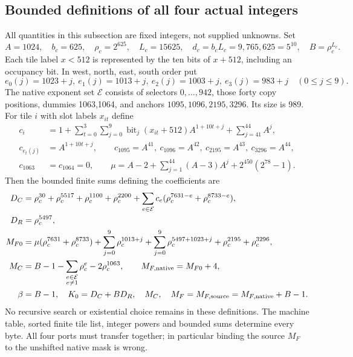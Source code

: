\documentclass[11pt]{article}
\begin{document}
\subsection{Bounded definitions of all four actual integers}
All quantities in this subsection are fixed integers, not supplied unknowns. Set
\[
 A=1024,\quad b_c=625,\quad\rho_c=2^{625},\quad L_c=15625,
 \quad d_c=b_cL_c=9{,}765{,}625=5^{10},\quad B=\rho_c^{L_c}.
\]
Each tile label $x<512$ is represented by the ten bits of $x+512$, including an occupancy bit. In west, north, east, south order put
\[
 e_0(j)=1023+j,\ e_1(j)=1013+j,\ e_2(j)=1003+j,\ e_3(j)=983+j
 \quad(0\le j\le9).
\]
The native exponent set $\mathcal E$ consists of selectors $0,\ldots,942$, those forty copy positions, dummies 1063,1064, and anchors $1095,1096,2195,3296$. Its size is 989. For tile $i$ with slot labels $x_{it}$ define
\begin{align*}
 c_i&=1+\sum_{t=0}^3\sum_{j=0}^9\operatorname{bit}_j(x_{it}+512)A^{1+10t+j}
       +\sum_{j=41}^{44}A^j,\\
 c_{e_t(j)}&=A^{1+10t+j},\qquad
 c_{1095}=A^{41},\ c_{1096}=A^{42},\ c_{2195}=A^{43},\ c_{3296}=A^{44},\\
 c_{1063}&=c_{1064}=0,\qquad
 \mu=A-2+\sum_{j=1}^{44}(A-3)A^j+2^{450}(2^{78}-1).
\end{align*}
Then the bounded finite sums defining the coefficients are
\begin{align}
 D_C={}&\rho_c^{30}+\rho_c^{5517}+\rho_c^{1100}+\rho_c^{2200}
       +\sum_{e\in\mathcal E}c_e(\rho_c^{7631-e}+\rho_c^{8733-e}),\notag\\
 D_R={}&\rho_c^{5497},\notag\\
 M_{F0}={}&\mu(\rho_c^{7631}+\rho_c^{8733})
       +\sum_{j=0}^9\rho_c^{1013+j}
       +\sum_{j=0}^9\rho_c^{5497+1023+j}
       +\rho_c^{2195}+\rho_c^{3296},\notag\\
 M_C={}&B-1-\sum_{\substack{e\in\mathcal E\\e\ne1}}\rho_c^e-2\rho_c^{1063},
 \qquad M_{F,\mathrm{native}}=M_{F0}+4,\notag\\
 \beta={}&B-1,\quad K_0=D_C+BD_R,\quad M_C,\quad
 M_F=M_{F,\mathrm{source}}=M_{F,\mathrm{native}}+B-1.\label{eq:ports}
\end{align}
No recursive search or existential choice remains in these definitions. The machine table, sorted finite tile list, integer powers and bounded sums determine every byte. All four ports must transfer together; in particular binding the source $M_F$ to the unshifted native mask is wrong.
\end{document}
